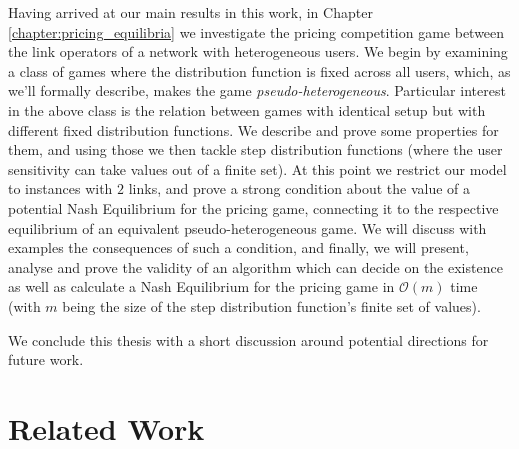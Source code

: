 \documentclass[10pt,a4paper]{book}
\theoremstyle{definition}
\theoremstyle{comment}
\begin{document}
Having arrived at our main results in this work, in Chapter \ref{chapter:pricing_equilibria} we investigate the pricing competition game between the link operators of a network with heterogeneous users.
We begin by examining a class of games where the distribution function is fixed across all users, which, as we'll formally describe, makes the game \textit{pseudo-heterogeneous}.
Particular interest in the above class is the relation between games with identical setup but with different fixed distribution functions.
We describe and prove some properties for them, and using those we then tackle step distribution functions (where the user sensitivity can take values out of a finite set).
At this point we restrict our model to instances with $2$ links, and prove a strong condition about the value of a potential Nash Equilibrium for the pricing game, connecting it to the respective equilibrium of an equivalent pseudo-heterogeneous game.
We will discuss with examples the consequences of such a condition, and finally, we will present, analyse and prove the validity of an algorithm which can decide on the existence as well as calculate a Nash Equilibrium for the pricing game in $\mathcal{O}(m)$ time (with $m$ being the size of the step distribution function's finite set of values).

We conclude this thesis with a short discussion around potential directions for future work.


\section{Related Work}
\label{section:related_work}
\end{document}
